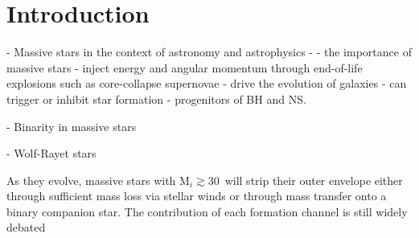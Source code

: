 \chapter{Introduction}\label{ch:introduction}


\cleardoublepage

- Massive stars in the context of astronomy and astrophysics
- - the importance of massive stars
  - inject energy and angular momentum through end-of-life explosions such as core-collapse supernovae
  - drive the evolution of galaxies
  - can trigger or inhibit star formation
  - progenitors of BH and NS.

- Binarity in massive stars

- Wolf-Rayet stars

As they evolve, massive stars with M$_i \gtrsim 30\,$\Msun{} will strip their outer envelope either through sufficient mass loss via stellar winds or through mass transfer onto a binary companion star. The contribution of each formation channel is still widely debated \citep{}
